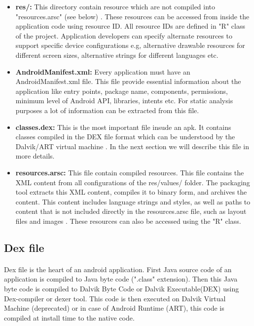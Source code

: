 \documentclass[../main.tex]{subfile}
\begin{document}
\begin{itemize}
			\item \textbf{res/:} This directory contain resource which are not compiled into "resources.arsc" (see below) \cite{APK_structure}. These resources can be accessed from inside the application code using resource ID. All resource IDs are defined in "R" class of the project. Application developers can specify alternate resources to support specific device configurations e.g, alternative drawable resources for different screen sizes, alternative strings for different languages etc.
			
			\item \textbf{AndroidManifest.xml:} Every application must have an AndroidManifest.xml file. This file provide essential information about the application like entry points, package name, components, permissions, minimum level of Android API, libraries, intents etc. For static analysis purposes a lot of information can be extracted from this file.
			
			\item \textbf{classes.dex:} This is the most important file insude an apk. It contains classes compiled in the DEX file format which can be understood by the Dalvik/ART virtual machine \cite{APK_structure}. In the next section we will describe this file in more details.
			
			\item \textbf{resources.arsc:} This file contain compiled resources. This file contains the XML content from all configurations of the res/values/ folder. The packaging tool extracts this XML content, compiles it to binary form, and archives the content. This content includes language strings and styles, as well as paths to content that is not included directly in the resources.arsc file, such as layout files and images \cite{APK_structure}. These resources can also be accessed using the "R" class.
		\end{itemize}
		

	\subsection{Dex file}\label{sec:dex}
		\paragraph{} Dex file is the heart of an android application. First Java source code of an application is compiled to Java byte code (".class" extension). Then this Java byte code is compiled to Dalvik Byte Code or Dalvik Executable(DEX) using Dex-compiler or dexer tool. This code is then executed on Dalvik Virtual Machine (deprecated) or in case of Android Runtime (ART), this code is compiled at install time to the native code. 
\end{document}
